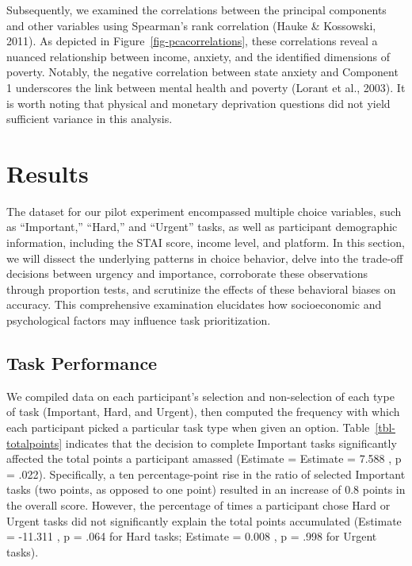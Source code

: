 \documentclass[
]{report}
\begin{document}
Subsequently, we examined the correlations between the principal
components and other variables using Spearman's rank correlation (Hauke
\& Kossowski, 2011). As depicted in Figure~\ref{fig-pcacorrelations},
these correlations reveal a nuanced relationship between income,
anxiety, and the identified dimensions of poverty. Notably, the negative
correlation between state anxiety and Component 1 underscores the link
between mental health and poverty (Lorant et al., 2003). It is worth
noting that physical and monetary deprivation questions did not yield
sufficient variance in this analysis.

\hypertarget{results}{%
\section{Results}\label{results}}

The dataset for our pilot experiment encompassed multiple choice
variables, such as ``Important,'' ``Hard,'' and ``Urgent'' tasks, as
well as participant demographic information, including the STAI score,
income level, and platform. In this section, we will dissect the
underlying patterns in choice behavior, delve into the trade-off
decisions between urgency and importance, corroborate these observations
through proportion tests, and scrutinize the effects of these behavioral
biases on accuracy. This comprehensive examination elucidates how
socioeconomic and psychological factors may influence task
prioritization.

\hypertarget{task-performance}{%
\subsection{Task Performance}\label{task-performance}}

We compiled data on each participant's selection and non-selection of
each type of task (Important, Hard, and Urgent), then computed the
frequency with which each participant picked a particular task type when
given an option. Table~\ref{tbl-totalpoints} indicates that the decision
to complete Important tasks significantly affected the total points a
participant amassed (Estimate = Estimate = 7.588 , p = .022).
Specifically, a ten percentage-point rise in the ratio of selected
Important tasks (two points, as opposed to one point) resulted in an
increase of 0.8 points in the overall score. However, the percentage of
times a participant chose Hard or Urgent tasks did not significantly
explain the total points accumulated (Estimate = -11.311 , p = .064 for
Hard tasks; Estimate = 0.008 , p = .998 for Urgent tasks).
\end{document}
